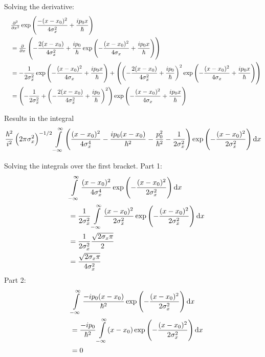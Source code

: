 \documentclass[a4paper,german,12pt,smallheadings]{scrartcl}
\begin{document}
\begin{enumerate}[a)]
    Solving the derivative:
    \begin{align*}
      \quad&\pd[2]{}{x} \exp\del{\frac{-(x-x_0)^2}{4 \sigma_x^2} + \frac{ip_0x}{\hbar}} \\
      &= \pd{}{x} \del{-\frac{2(x-x_0)}{4\sigma_x^2} + \frac{ip_0}{\hbar} \exp\del{-\frac{(x-x_0)^2}{4\sigma_x} + \frac{ip_0x}{\hbar}}} \\
      &= -\frac{1}{2 \sigma_x^2} \exp\del{-\frac{(x-x_0)^2}{4\sigma_x} + \frac{ip_0x}{\hbar}} +
      \del{\del{-\frac{2(x-x_0)}{4\sigma_x^2} + \frac{ip_0}{\hbar}}^2 \exp\del{-\frac{(x-x_0)^2}{4\sigma_x} + \frac{ip_0x}{\hbar}}} \\
      &= \del{-\frac{1}{2 \sigma_x^2} +
      \del{-\frac{2(x-x_0)}{4\sigma_x^2} + \frac{ip_0}{\hbar}}^2} 
      \exp\del{-\frac{(x-x_0)^2}{4\sigma_x} + \frac{ip_0x}{\hbar}}
    \end{align*}

    Results in the integral
    \begin{align*}
      \frac{\hbar^2}{i^2} \del{2 \pi \sigma_x^2}^{-1/2} \int\limits_{-\infty}^\infty 
      \del{\frac{(x-x_0)^2}{4\sigma_x^4} - \frac{ip_0(x-x_0)}{\hbar^2} - \frac{p_0^2}{\hbar^2} - \frac{1}{2\sigma_x^2}}
      \exp\del{-\frac{(x-x_0)^2}{2\sigma_x^2}} \dif x
    \end{align*}

    Solving the integrals over the first bracket. Part 1:
    \begin{align*}
      \quad&\int\limits_{-\infty}^\infty
      \frac{(x-x_0)^2}{4\sigma_x^4}
      \exp\del{-\frac{(x-x_0)^2}{2\sigma_x^2}} \dif x \\
      &=
      \frac{1}{2\sigma_x^2} \int\limits_{-\infty}^\infty
      \frac{(x-x_0)^2}{2\sigma_x^2}
      \exp\del{-\frac{(x-x_0)^2}{2\sigma_x^2}} \dif x \\
      &=
      \frac{1}{2 \sigma_x^2} \frac{\sqrt{2 \sigma_x \pi}}{2} \\
      &= \frac{\sqrt{2 \sigma_x \pi}}{4 \sigma_x^2}
    \end{align*}
    Part 2:
    \begin{align*}
      \quad&\int\limits_{-\infty}^\infty
      \frac{-ip_0(x-x_0)}{\hbar^2}
      \exp\del{-\frac{(x-x_0)^2}{2\sigma_x^2}} \dif x \\
      &=
      \frac{-ip_0}{\hbar^2} \int\limits_{-\infty}^\infty
      (x-x_0)
      \exp\del{-\frac{(x-x_0)^2}{2\sigma_x^2}} \dif x \\
      &= 0
    \end{align*}


\end{enumerate}
\end{document}
